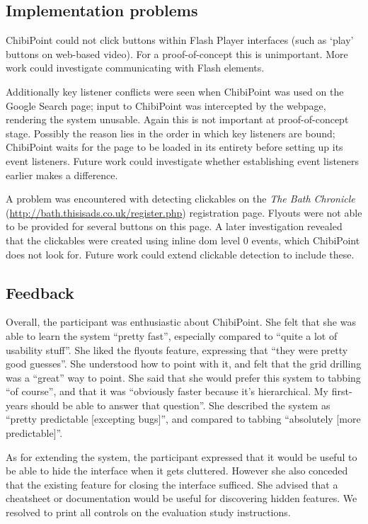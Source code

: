 \documentclass[11pt,openright,a4paper]{report}
\begin{document}
\subsection{Implementation problems}
ChibiPoint could not click buttons within Flash Player interfaces (such as `play' buttons on web-based video). For a proof-of-concept this is unimportant. More work could investigate communicating with Flash elements.

Additionally key listener conflicts were seen when ChibiPoint was used on the Google Search page; input to ChibiPoint was intercepted by the webpage, rendering the system unusable. Again this is not important at proof-of-concept stage. Possibly the reason lies in the order in which key listeners are bound; ChibiPoint waits for the page to be loaded in its entirety before setting up its event listeners. Future work could investigate whether establishing event listeners earlier makes a difference.

A problem was encountered with detecting clickables on the \textit{The Bath Chronicle} (\url{http://bath.thisisads.co.uk/register.php}) registration page. Flyouts were not able to be provided for several buttons on this page. A later investigation revealed that the clickables were created using inline \gls{dom} level 0 events, which ChibiPoint does not look for. Future work could extend clickable detection to include these.

\subsection{Feedback}
\label{sec:usability_feedback}
Overall, the participant was enthusiastic about ChibiPoint. She felt that she was able to learn the system ``pretty fast'', especially compared to ``quite a lot of usability stuff''. She liked the flyouts feature, expressing that ``they were pretty good guesses''. She understood how to point with it, and felt that the grid drilling was a ``great'' way to point. She said that she would prefer this system to tabbing ``of course'', and that it was ``obviously faster because it's hierarchical. My first-years should be able to answer that question''. She described the system as ``pretty predictable [excepting bugs]'', and compared to tabbing ``absolutely [more predictable]''.

As for extending the system, the participant expressed that it would be useful to be able to hide the interface when it gets cluttered. However she also conceded that the existing feature for closing the interface sufficed. She advised that a cheatsheet or documentation would be useful for discovering hidden features. We resolved to print all controls on the evaluation study instructions.
\end{document}
